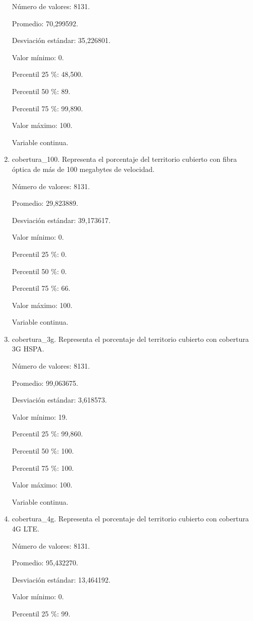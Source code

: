 \begin{enumerate}
	Número de valores: 8131.
	
	Promedio: 70,299592.
	
	Desviación estándar: 35,226801.
	
	Valor mínimo: 0.
	
	Percentil 25 \%: 48,500.
	
	Percentil 50 \%: 89.
	
	Percentil 75 \%: 99,890.
	
	Valor máximo: 100.
	
	Variable continua.

	\item cobertura\_100. Representa el porcentaje del territorio cubierto con fibra óptica de más de 100 megabytes de velocidad.
	
	Número de valores: 8131.
	
	Promedio: 29,823889.
	
	Desviación estándar: 39,173617.
	
	Valor mínimo: 0.
	
	Percentil 25 \%: 0.
	
	Percentil 50 \%: 0.
	
	Percentil 75 \%: 66.
	
	Valor máximo: 100.
	
	Variable continua.

	\item cobertura\_3g. Representa el porcentaje del territorio cubierto con cobertura 3G HSPA.
	
	Número de valores: 8131.
	
	Promedio: 99,063675.
	
	Desviación estándar: 3,618573.
	
	Valor mínimo: 19.
	
	Percentil 25 \%: 99,860.
	
	Percentil 50 \%: 100.
	
	Percentil 75 \%: 100.
	
	Valor máximo: 100.
	
	Variable continua.

	\item cobertura\_4g. Representa el porcentaje del territorio cubierto con cobertura 4G LTE.
	
	Número de valores: 8131.
	
	Promedio: 95,432270.
	
	Desviación estándar: 13,464192.
	
	Valor mínimo: 0.
	
	Percentil 25 \%: 99.
	

\end{enumerate}
